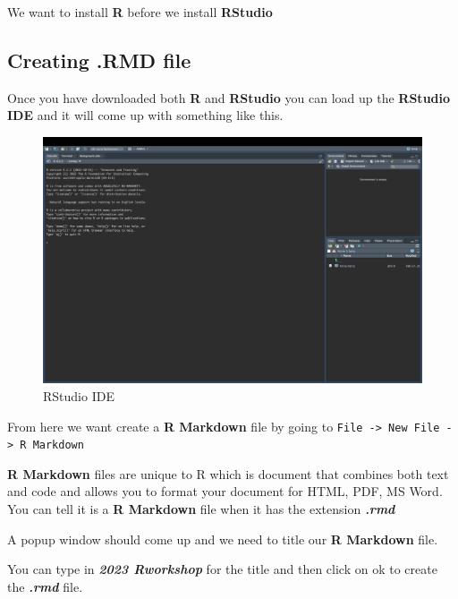 \documentclass[
]{book}
\begin{document}
We want to install \textbf{R} before we install \textbf{RStudio}

\hypertarget{creating-.rmd-file}{%
\subsection{Creating .RMD file}\label{creating-.rmd-file}}

Once you have downloaded both \textbf{R} and \textbf{RStudio} you can load up the \textbf{RStudio IDE} and it will come up with something like this.

\begin{figure}
\includegraphics[width=50in]{images/2.3rstudio} \caption{RStudio IDE}\label{fig:unnamed-chunk-3}
\end{figure}

From here we want create a \textbf{R Markdown} file by going to \texttt{File\ -\textgreater{}\ New\ File\ -\textgreater{}\ R\ Markdown}

\textbf{R Markdown} files are unique to R which is document that combines both text and code and allows you to format your document for HTML, PDF, MS Word. You can tell it is a \textbf{R Markdown} file when it has the extension \textbf{\emph{.rmd}}

A popup window should come up and we need to title our \textbf{R Markdown} file.

You can type in \textbf{\emph{2023 Rworkshop}} for the title and then click on ok to create the \textbf{\emph{.rmd}} file.
\end{document}
